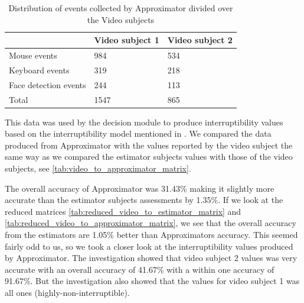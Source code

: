 \documentclass{sigchi}
\begin{document}
\begin{table}[h]
  \begin{tabular}{@{}lll@{}}
    \toprule
     & Video subject 1 & Video subject 2\\ \midrule
    Mouse events       & 984    & 534    \\
    Keyboard events       & 319    & 218    \\
    Face detection events       & 244    & 113    \\ \midrule
    Total   & 1547 & 865\\ \bottomrule
  \end{tabular}
  \caption{Distribution of events collected by Approximator divided over the Video subjects}
  \label{tab:event_distribution}
\end{table}

This data was used by the decision module to produce interruptibility values based on the interruptibility model mentioned in .
We compared the data produced from Approximator with the values reported by the video subject the same way as we compared the estimator subjects values with those of the video subjects, see \autoref{tab:video_to_approximator_matrix}.

The overall accuracy of Approximator was 31.43\% making it slightly more accurate than the estimator subjects assessments by 1.35\%.
If we look at the reduced matrices \autoref{tab:reduced_video_to_estimator_matrix} and \autoref{tab:reduced_video_to_approximator_matrix}, we see that the overall accuracy from the estimators are 1.05\% better than Approximators accuracy.
This seemed fairly odd to us, so we took a closer look at the interruptibility values produced by Approximator.
The investigation showed that video subject 2 values was very accurate with an overall accuracy of 41.67\% with a within one accuracy of 91.67\%.
But the investigation also showed that the values for video subject 1 was all ones (highly-non-interruptible).
\end{document}
